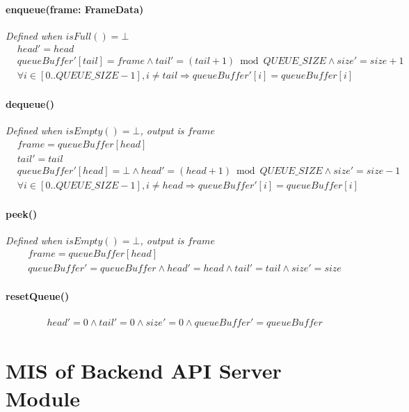 \documentclass[12pt, titlepage]{article}
\begin{document}
\paragraph{enqueue(frame: FrameData)}
\textit{Defined when $isFull() = \bot$}
\begin{align*}
    &head' = head \\
    &queueBuffer'[tail] = frame \wedge tail' = (tail+1) \bmod QUEUE\_SIZE \wedge size' = size + 1 \\
    &\forall i \in [0..QUEUE\_SIZE-1], i \ne tail \Rightarrow queueBuffer'[i] = queueBuffer[i]
\end{align*}

\paragraph{dequeue()}
\textit{Defined when $isEmpty() = \bot$, output is $frame$}
\begin{align*}
    &frame = queueBuffer[head] \\
    &tail' = tail \\
    &queueBuffer'[head] = \bot \wedge head' = (head+1) \bmod QUEUE\_SIZE \wedge size' = size - 1 \\
    &\forall i \in [0..QUEUE\_SIZE-1], i \ne head \Rightarrow queueBuffer'[i] = queueBuffer[i]
\end{align*}

\paragraph{peek()}
\textit{Defined when $isEmpty() = \bot$, output is $frame$}
\begin{align*}
    &frame = queueBuffer[head] \\
    &queueBuffer' = queueBuffer \wedge head' = head \wedge tail' = tail \wedge size' = size
\end{align*}

\paragraph{resetQueue()}
\begin{align*}
    &head' = 0 \wedge tail' = 0 \wedge size' = 0 \wedge queueBuffer' = queueBuffer
\end{align*}


\section{MIS of Backend API Server Module} \label{M8}
\end{document}
